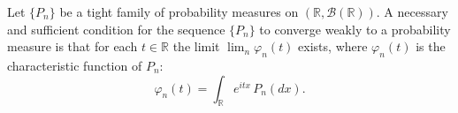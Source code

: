 Let $\{P_n\}$ be a tight family of probability measures on $(\mathbb{R}, \mathcal{B}(\mathbb{R}))$. A necessary and sufficient condition for the sequence $\{P_n\}$ to converge weakly to a probability measure is that for each $t \in \mathbb{R}$ the limit $\lim_n \varphi_n(t)$ exists, where $\varphi_n(t)$ is the characteristic function of $P_n$:
$$\varphi_n(t) = \int_{\mathbb{R}} e^{itx} \, P_n(dx).$$
